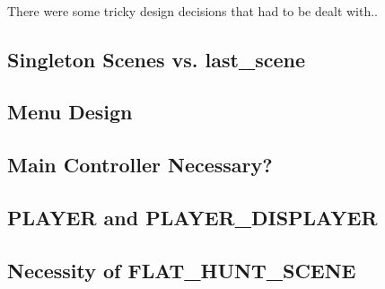 
\paragraph{}
There were some tricky design decisions that had to be dealt with..

\subsection{Singleton Scenes vs. last\_scene}
\subsection{Menu Design}
\subsection{Main Controller Necessary?}
\subsection{PLAYER and PLAYER\_DISPLAYER}
\subsection{Necessity of FLAT\_HUNT\_SCENE}

